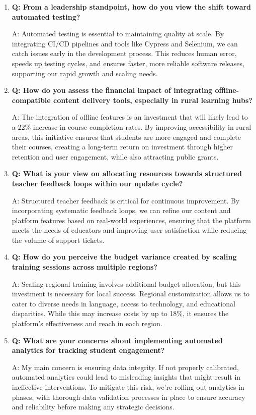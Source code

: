 \documentclass[12pt,a4paper,oneside]{book}
\begin{document}
\begin{enumerate}
\item \textbf{Q: From a leadership standpoint, how do you view the shift toward automated testing?} 

A: Automated testing is essential to maintaining quality at scale. By integrating CI/CD pipelines and tools like Cypress and Selenium, we can catch issues early in the development process. This reduces human error, speeds up testing cycles, and ensures faster, more reliable software releases, supporting our rapid growth and scaling needs.

\item \textbf{Q: How do you assess the financial impact of integrating offline-compatible content delivery tools, especially in rural learning hubs?} 

A: The integration of offline features is an investment that will likely lead to a 22\% increase in course completion rates. By improving accessibility in rural areas, this initiative ensures that students are more engaged and complete their courses, creating a long-term return on investment through higher retention and user engagement, while also attracting public grants.

\item \textbf{Q: What is your view on allocating resources towards structured teacher feedback loops within our update cycle?}

A: Structured teacher feedback is critical for continuous improvement. By incorporating systematic feedback loops, we can refine our content and platform features based on real-world experiences, ensuring that the platform meets the needs of educators and improving user satisfaction while reducing the volume of support tickets.

\item \textbf{Q: How do you perceive the budget variance created by scaling training sessions across multiple regions?}

A: Scaling regional training involves additional budget allocation, but this investment is necessary for local success. Regional customization allows us to cater to diverse needs in language, access to technology, and educational disparities. While this may increase costs by up to 18\%, it ensures the platform’s effectiveness and reach in each region.

\item \textbf{Q: What are your concerns about implementing automated analytics for tracking student engagement?}

A: My main concern is ensuring data integrity. If not properly calibrated, automated analytics could lead to misleading insights that might result in ineffective interventions. To mitigate this risk, we’re rolling out analytics in phases, with thorough data validation processes in place to ensure accuracy and reliability before making any strategic decisions.


\end{enumerate}
\end{document}
